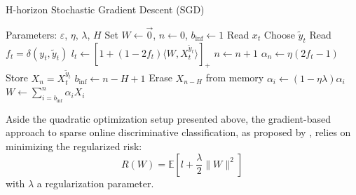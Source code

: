 \documentclass[preprint,12pt,authoryear]{elsarticle}
\begin{document}
\begin{algorithm}[t!]
	\caption{H-horizon Stochastic Gradient Descent (SGD)}\label{algo:HGD}
	\begin{algorithmic}
		
		\STATE Parameters:  $\varepsilon$, $\eta$, $\lambda$, $H$
		\STATE Set $W \leftarrow \vec{0}$, $n \leftarrow 0$, $b_\text{inf}\leftarrow 1$
		\STATE Read $x_t$
		\STATE Choose $\tilde{y}_t$		\STATE Read $f_t = \delta(y_t,\tilde{y}_t)$
		\STATE $l_t \leftarrow \left[ 1+(1-2f_t)\langle W,X_t^{\tilde{y}_t}\rangle\right]_{+}$ 
		\STATE $n \leftarrow n + 1$
		\STATE $\alpha_{n} \leftarrow \eta (2 f_t-1)$
		\STATE Store $X_{n} = X_t^{\tilde{y}_t}$
		\STATE $b_\text{inf} \leftarrow n - H + 1$
		\STATE Erase $X_{n - H }$ from memory
		\ENDIF 
		\STATE $\alpha_i \leftarrow (1 - \eta\lambda) \alpha_i$
		\ENDFOR			
		\STATE $W \leftarrow \sum_{i=b_\text{inf}}^n \alpha_i X_{i}$
		\ENDIF
		\ENDFOR
	\end{algorithmic}
\end{algorithm}

Aside the quadratic optimization setup presented above, the gradient-based approach to sparse online discriminative classification, as proposed by \cite{kivinen2004online}, relies on minimizing the regularized risk:
$$R(W) = \mathbb{E}\left[ l + \frac{\lambda}{2}\|W\|^2\right]$$
with $\lambda$ a regularization parameter.
\end{document}
